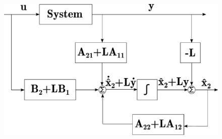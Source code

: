 \begin{figure}[H]
	\includegraphics[scale=.35]{figures/observerDiagram}
	\centering
	\captionsetup{justification=centering}
	\label{observerDiagram}
\end{figure}


